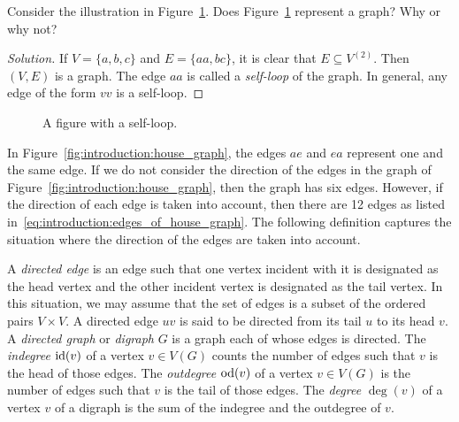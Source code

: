 \begin{example}
Consider the illustration in
Figure~\ref{fig:introduction:self_loop}. Does
Figure~\ref{fig:introduction:self_loop} represent a graph? Why or why not?
\end{example}

\begin{proof}[Solution]
If $V = \{ a, b, c \}$ and $E = \{ aa, bc \}$, it is clear that $E
\subseteq V^{(2)}$. Then $(V, E)$ is a graph. The edge $aa$ is
called a \emph{self-loop} of the graph. In general, any edge of the
form $vv$ is a self-loop.
\end{proof}

\begin{figure}[!htbp]
\centering

\caption{A figure with a self-loop.}
\label{fig:introduction:self_loop}
\end{figure}

In Figure~\ref{fig:introduction:house_graph}, the edges $ae$ and $ea$
represent one and the same edge. If we do not consider the direction
of the edges in the graph of
Figure~\ref{fig:introduction:house_graph}, then the graph has six
edges. However, if the direction of each edge is taken into account,
then there are 12 edges as listed
in~\eqref{eq:introduction:edges_of_house_graph}. The following
definition captures the situation where the direction of the edges are
taken into account.

A \emph{directed edge} is an edge such that one
vertex incident with it is designated as the head vertex and the other
incident vertex is designated as the tail vertex. In this situation,
we may assume that the set of edges is a subset of the ordered pairs
$V \times V$. A directed edge $uv$ is said to be directed from its
tail $u$ to its head $v$. A
\emph{directed graph} or
\emph{digraph} $G$ is a graph each of whose edges is
directed. The \emph{indegree} $\operatorname*{id}(v)$\index{$\id$} of
a vertex $v \in V(G)$ counts the number of edges such that $v$ is the
head of those edges. The \emph{outdegree}
$\operatorname*{od}(v)$\index{$\od$} of a vertex $v \in V(G)$ is the number of edges
such that $v$ is the tail of those edges. The
\emph{degree} $\deg(v)$\index{$\deg$} of a vertex $v$ of
a digraph is the sum of the indegree and the outdegree of $v$.


